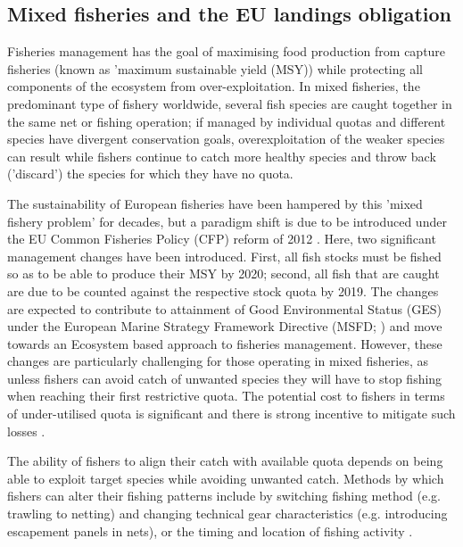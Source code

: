 \documentclass{nature}
\begin{document}
\begin{linenumbers}
\begin{abstract}
[263 words]

\end{abstract}

\section*{}

\subsection{Mixed fisheries and the EU landings obligation} 

Fisheries management has the goal of maximising food production from capture
fisheries (known as 'maximum sustainable yield (MSY)) while protecting all
components of the ecosystem from over-exploitation. In mixed fisheries, the
predominant type of fishery worldwide, several fish species are caught together
in the same net or fishing operation; if managed by individual quotas and
different species have divergent conservation goals, overexploitation of the
weaker species can result while fishers continue to catch more healthy species
and throw back ('discard') the species for which they have no quota.

The sustainability of European fisheries have been hampered by this 'mixed
fishery problem' for decades, but a paradigm shift is due to be introduced
under the EU Common Fisheries Policy (CFP) reform of 2012
\cite{EuropeanParliamentandCounciloftheEuropeanUnion2013}. Here, two
significant management changes have been introduced. First, all fish stocks
must be fished so as to be able to produce their MSY by 2020; second, all fish
that are caught are due to be counted against the respective stock quota by
2019. The changes are expected to contribute to attainment of Good
Environmental Status (GES) under the European Marine Strategy Framework
Directive (MSFD; \cite{EuropeanParliament2008}) and move towards an Ecosystem
based approach to fisheries management. However, these changes are particularly
challenging for those operating in mixed fisheries, as unless fishers can avoid
catch of unwanted species they will have to stop fishing when reaching their
first restrictive quota. The potential cost to fishers in terms of
under-utilised quota is significant \cite{Hoff2010a, Ulrich2016} and there is
strong incentive to mitigate such losses \cite{Condie2013, Condie2013a}.

The ability of fishers to align their catch with available quota depends on
being able to exploit target species while avoiding unwanted catch. Methods by
which fishers can alter their fishing patterns include by switching fishing
method (e.g. trawling to netting) and changing technical gear characteristics
(e.g. introducing escapement panels in nets), or the timing and location of
fishing activity \cite{Fulton2011b, vanPutten2012a}.


\end{linenumbers}
\end{document}
